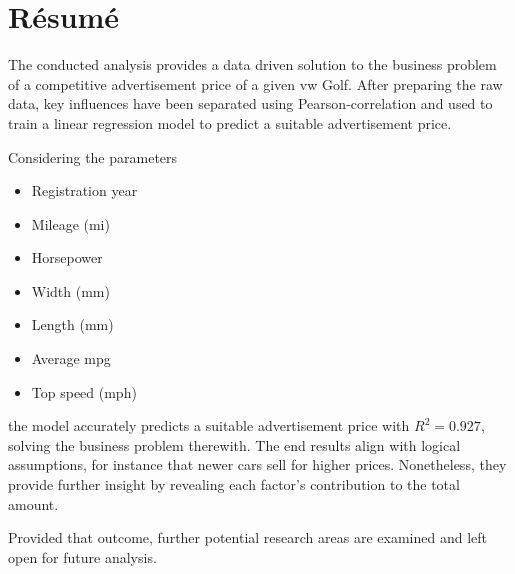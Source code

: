 \section{Résumé}

The conducted analysis provides a data driven solution to the business problem of a competitive advertisement price of a given \ac{vw} Golf.
After preparing the raw data, key influences have been separated using Pearson-correlation and used to train a linear regression model to
predict a suitable advertisement price.
\par
Considering the parameters 
\begin{itemize}
    \item Registration year
    \item Mileage (mi)
    \item Horsepower
    \item Width (mm)
    \item Length (mm)
    \item Average mpg
    \item Top speed (mph)
\end{itemize}
the model accurately predicts a suitable advertisement price with $R^2 = 0.927$, solving the business problem therewith.
The end results align with logical assumptions, for instance that newer cars sell for higher prices.
Nonetheless, they provide further insight by revealing each factor's contribution to the total amount.
\par
Provided that outcome, further potential research areas are examined and left open for future analysis. 


